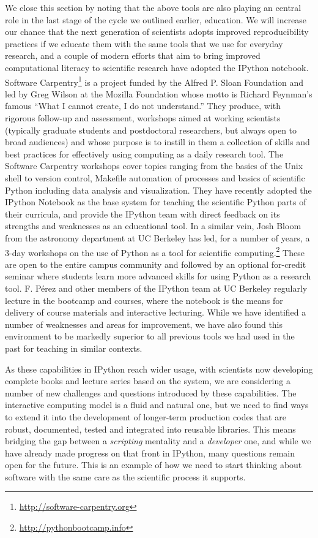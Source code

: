 \documentclass[ChapterTOCs,krantz2]{krantz} %
\begin{document}
We close this section by noting that the above tools are also playing an
central role in the last stage of the cycle we outlined earlier, education.  We
will increase our chance that the next generation of scientists adopts improved
reproducibility practices if we educate them with the same tools that we use
for everyday research, and a couple of modern efforts that aim to bring
improved computational literacy to scientific research have adopted the IPython
notebook.  Software Carpentry\footnote{\url{http://software-carpentry.org}} is
a project funded by the Alfred P. Sloan Foundation and led by Greg Wilson at
the Mozilla Foundation whose motto is Richard Feynman's famous ``What I cannot
create, I do not understand.''  They produce, with rigorous follow-up and
assessment, workshops aimed at working scientists (typically graduate students
and postdoctoral researchers, but always open to broad audiences) and whose
purpose is to instill in them a collection of skills and best practices for
effectively using computing as a daily research tool.  The Software Carpentry
workshops cover topics ranging from the basics of the Unix shell to version
control, Makefile automation of processes and basics of scientific Python
including data analysis and visualization.  They have recently adopted the
IPython Notebook as the base system for teaching the scientific Python parts of
their curricula, and provide the IPython team with direct feedback on its
strengths and weaknesses as an educational tool.  In a similar vein, Josh Bloom
from the astronomy department at UC Berkeley has led, for a number of years, a
3-day workshops on the use of Python as a tool for scientific
computing.\footnote{\url{http://pythonbootcamp.info}}  These are open to the
entire campus community and followed by an optional for-credit seminar where
students learn more advanced skills for using Python as a research tool.  F.
Pérez and other members of the IPython team at UC Berkeley regularly lecture in
the bootcamp and courses, where the notebook is the means for delivery of
course materials and interactive lecturing.  While we have identified a number
of weaknesses and areas for improvement, we have also found this environment to
be markedly superior to all previous tools we had used in the past for teaching
in similar contexts.

As these capabilities in IPython reach wider usage, with scientists now
developing complete books and lecture series based on the system, we are
considering a number of new challenges and questions introduced by these
capabilities.  The interactive computing model is a fluid and natural one, but
we need to find ways to extend it into the development of longer-term
production codes that are robust, documented, tested and integrated into
reusable libraries.  This means bridging the gap between a \emph{scripting}
mentality and a \emph{developer} one, and while we have already made progress on
that front in IPython, many questions remain open for the future.  This is an
example of how we need to start thinking about software with the same care as
the scientific process it supports.
\end{document}
